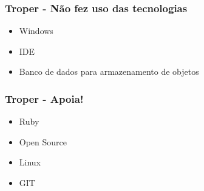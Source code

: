 \documentclass{beamer}
\begin{document}
\begin{frame} 
\frametitle{Troper - Não fez uso das tecnologias }
  \begin{itemize} 
    \item Windows 
    \item IDE
    \item Banco de dados para armazenamento de objetos
  \end{itemize} 
\end{frame} 

\begin{frame} 
\frametitle{Troper - Apoia!}
  \begin{itemize} 
    \item Ruby 
    \item Open Source 
    \item Linux 
    \item GIT 
  \end{itemize} 
\end{frame} 
\end{document}
